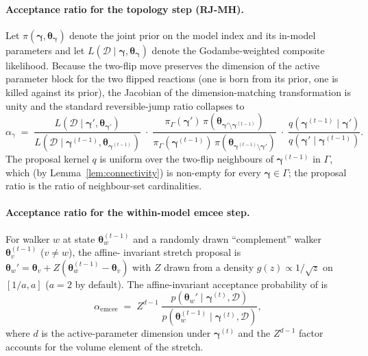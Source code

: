 \documentclass[12pt]{article}
\theoremstyle{plain}
\theoremstyle{definition}
\theoremstyle{remark}
\begin{document}
\paragraph{Acceptance ratio for the topology step (RJ-MH).}
Let $\pi(\boldsymbol\gamma,\boldsymbol\theta_{\boldsymbol\gamma})$ denote the
joint prior on the model index and its in-model parameters and let
$L(\mathcal{D}\mid\boldsymbol\gamma,\boldsymbol\theta_{\boldsymbol\gamma})$
denote the Godambe-weighted composite likelihood.  Because the two-flip move
preserves the dimension of the active parameter block for the two flipped
reactions (one is born from its prior, one is killed against its prior), the
Jacobian of the dimension-matching transformation is unity and the standard
reversible-jump ratio collapses to
%
\begin{equation}
\alpha_\gamma \;=\;
  \frac{L(\mathcal{D}\mid\boldsymbol\gamma',\boldsymbol\theta_{\boldsymbol\gamma'})}
       {L(\mathcal{D}\mid\boldsymbol\gamma^{(t-1)},\boldsymbol\theta_{\boldsymbol\gamma^{(t-1)}})}\;
  \cdot\;
  \frac{\pi_\Gamma(\boldsymbol\gamma')\,\pi(\boldsymbol\theta_{\boldsymbol\gamma'\setminus\boldsymbol\gamma^{(t-1)}})}
       {\pi_\Gamma(\boldsymbol\gamma^{(t-1)})\,\pi(\boldsymbol\theta_{\boldsymbol\gamma^{(t-1)}\setminus\boldsymbol\gamma'})}\;
  \cdot\;
  \frac{q(\boldsymbol\gamma^{(t-1)}\mid\boldsymbol\gamma')}
       {q(\boldsymbol\gamma'\mid\boldsymbol\gamma^{(t-1)})}.
\label{eq:alpha_gamma}
\end{equation}
%
The proposal kernel $q$ is uniform over the two-flip neighbours of
$\boldsymbol\gamma^{(t-1)}$ in $\Gamma$, which (by
Lemma~\ref{lem:connectivity}) is non-empty for every $\boldsymbol\gamma\in\Gamma$;
the proposal ratio is the ratio of neighbour-set cardinalities.

\paragraph{Acceptance ratio for the within-model emcee step.}
For walker $w$ at state $\boldsymbol\theta_w^{(t-1)}$ and a randomly drawn
``complement'' walker $\boldsymbol\theta_v^{(t-1)}$ ($v\ne w$), the affine-
invariant stretch proposal is
$\boldsymbol\theta_w' = \boldsymbol\theta_v + Z(\boldsymbol\theta_w^{(t-1)}-\boldsymbol\theta_v)$
with $Z$ drawn from a density $g(z)\propto 1/\sqrt{z}$ on $[1/a,a]$
($a=2$ by default).  The affine-invariant acceptance probability of
\citet{GoodmanWeare2010} is
%
\begin{equation}
\alpha_{\mathrm{emcee}} \;=\;
  Z^{d-1}\;
  \frac{p\!\left(\boldsymbol\theta_w' \mid \boldsymbol\gamma^{(t)},\mathcal{D}\right)}
       {p\!\left(\boldsymbol\theta_w^{(t-1)} \mid \boldsymbol\gamma^{(t)},\mathcal{D}\right)},
\label{eq:alpha_emcee}
\end{equation}
%
where $d$ is the active-parameter dimension under $\boldsymbol\gamma^{(t)}$ and
the $Z^{d-1}$ factor accounts for the volume element of the stretch.
\end{document}
